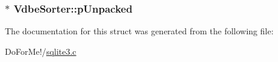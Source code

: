 \hypertarget{struct_vdbe_sorter_a0d85cdf1cf25c75cf90394d1bcfd27b9}{
\subsubsection[{p\-Unpacked}]{$\ast$ Vdbe\-Sorter\-::p\-Unpacked}}\label{struct_vdbe_sorter_a0d85cdf1cf25c75cf90394d1bcfd27b9}


The documentation for this struct was generated from the following file\-:\begin{DoxyCompactItemize}
\item 
Do\-For\-Me!/\hyperlink{sqlite3_8c}{sqlite3.\-c}\end{DoxyCompactItemize}
